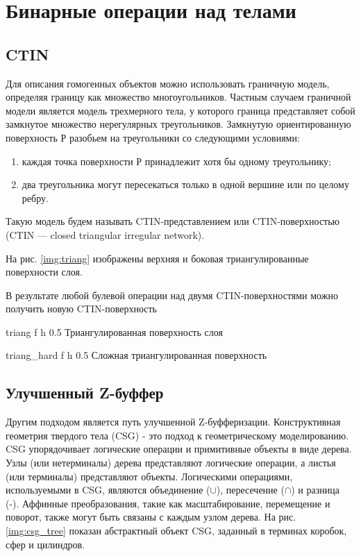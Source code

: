 \section{Бинарные операции над телами}

\subsection{CTIN}
Для описания гомогенных объектов можно
использовать граничную модель, определяя
границу как множество многоугольников. Частным случаем граничной модели является модель трехмерного тела, у которого граница
представляет собой замкнутое множество нерегулярных треугольников.
Замкнутую ориентированную поверхность Р разобьем на треугольники со следующими условиями:
\begin{enumerate}
    \item каждая точка поверхности Р принадлежит хотя бы одному треугольнику;
    \item два треугольника могут пересекаться только в одной вершине или по целому ребру.
\end{enumerate}

Такую модель будем называть
CTIN-представлением или CTIN-поверхностью
(CTIN — closed triangular irregular network).\cite{binary_CTIN}\newline

На рис. \ref{img:triang} изображены верхняя и боковая триангулированные поверхности слоя.

В результате любой булевой операции над двумя CTIN-поверхностями можно получить новую CTIN-поверхность

{triang} %
{f} %
{h} %
{0.5\textwidth} %
{Триангулированная поверхность слоя} %

{triang_hard} %
{f} %
{h} %
{0.5\textwidth} %
{Сложная триангулированная поверхность} %

\subsection{Улучшенный Z-буффер}
Другим подходом является путь улучшенной Z-буфферизации.
Конструктивная геометрия твердого тела (CSG) - это подход к геометрическому
моделированию. CSG упорядочивает логические операции и примитивные объекты
в виде дерева. Узлы (или нетерминалы) дерева представляют
логические операции, а листья (или терминалы) представляют объекты.
Логическими операциями, используемыми в CSG, являются объединение (\(\cup\)), пересечение
(\(\cap\)) и разница (-). Аффинные преобразования, такие как масштабирование, перемещение и поворот,
также могут быть связаны с каждым узлом дерева. На рис. \ref{img:csg_tree} показан абстрактный объект CSG, заданный в терминах коробок,
сфер и цилиндров. \cite{binary_Z}


